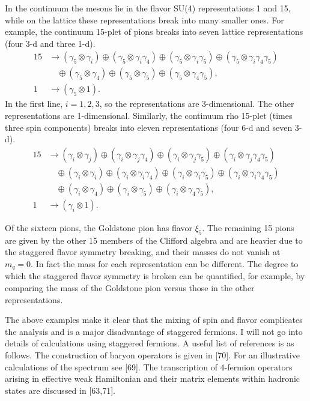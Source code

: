 In the continuum the mesons lie in the flavor SU(4) representations 1 and
15, while on the lattice these representations break into many smaller ones.
For example, the continuum 15-plet of pions breaks into seven lattice representations (four 3-d and three 1-d).
\begin{equation}
\begin{aligned}
15 &\to (\gamma_5\otimes\gamma_i) \oplus (\gamma_5\otimes\gamma_i\gamma_4)
\oplus (\gamma_5\otimes\gamma_i\gamma_5) \oplus (\gamma_5\otimes\gamma_i\gamma_4\gamma_5) \\
&\quad\oplus (\gamma_5\otimes\gamma_4) \oplus (\gamma_5\otimes\gamma_5) \oplus (\gamma_5\otimes\gamma_4\gamma_5), \\
1 &\to (\gamma_5\otimes 1) .
\end{aligned}
\label{eq:sf-pion-reps}
\end{equation}
In the first line, $i = 1, 2, 3$, so the representations are 3-dimensional. The
other representations are 1-dimensional. Similarly, the continuum rho 15-plet (times three spin components) breaks into eleven representations (four
6-d and seven 3-d).
\begin{equation}
\begin{aligned}
15 &\to (\gamma_i\otimes\gamma_j) \oplus (\gamma_i\otimes\gamma_j\gamma_4)
\oplus (\gamma_i\otimes\gamma_j\gamma_5) \oplus (\gamma_i\otimes\gamma_j\gamma_4\gamma_5) \\
&\quad\oplus (\gamma_i\otimes\gamma_i) \oplus (\gamma_i\otimes\gamma_i\gamma_4)
\oplus (\gamma_i\otimes\gamma_i\gamma_5) \oplus (\gamma_i\otimes\gamma_i\gamma_4\gamma_5) \\
&\quad\oplus (\gamma_i\otimes\gamma_4) \oplus (\gamma_i\otimes\gamma_5) \oplus (\gamma_i\otimes\gamma_4\gamma_5), \\
1 &\to (\gamma_i\otimes 1) .
\end{aligned}
\label{eq:sf-rho-reps}
\end{equation}

Of the sixteen pions, the Goldstone pion has flavor $\xi_5$. The remaining 15
pions are given by the other 15 members of the Clifford algebra and are
heavier due to the staggered flavor symmetry breaking, and their masses
do not vanish at $m_q = 0$. In fact the mass for each representation can be
different. The degree to which the staggered flavor symmetry is broken can
be quantified, for example, by comparing the mass of the Goldstone pion
versus those in the other representations.

The above examples make it clear that the mixing of spin and flavor
complicates the analysis and is a major disadvantage of staggered fermions.
I will not go into details of calculations using staggered fermions. A useful
list of references is as follows. The construction of baryon operators is
given in [70]. For an illustrative calculations of the spectrum see [69]. The
transcription of 4-fermion operators arising in effective weak Hamiltonian
and their matrix elements within hadronic states are discussed in [63,71].

